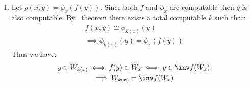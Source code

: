 \begin{enumerate}[label=]
    \item 
    Let $g(x, y) = \phi_x(f(y))$. Since both $f$ and $\phi_x$ are computable then $g$ is also computable. By \smn\ theorem there exists a total computable $k$ such that:
    \begin{gather*}
        f(x, y) \cong \phi_{k(x)}(y) \\
        \implies \phi_{k(x)}(y) = \phi_x(f(y))
    \end{gather*}
    Thus we have:
    \begin{gather*}
        y \in W_{k(x)} \iff f(y) \in W_x \iff y \in \inv f (W_x) \\
        \implies W_{k(x)} = \inv f (W_x)
    \end{gather*}
\end{enumerate}